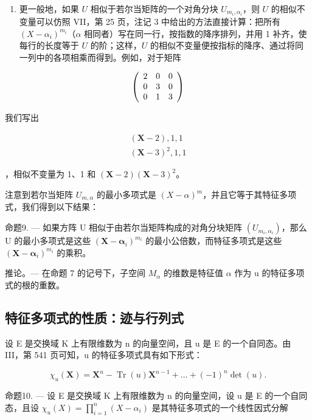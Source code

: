 \begin{enumerate}
\def\labelenumi{\arabic{enumi})}
\setcounter{enumi}{1}
\tightlist
\item
  更一般地，如果 \(U\) 相似于若尔当矩阵的一个对角分块 \(U_{m_i,\alpha_i}\)，则 \(U\) 的相似不变量可以仿照 VII，第 25 页，注记 3 中给出的方法直接计算：把所有 \((X - \alpha_i)^{m_i}\)（\(\alpha\) 相同者）写在同一行，按指数的降序排列，并用 1 补齐，使每行的长度等于 \(U\) 的阶；这样，\(U\) 的相似不变量便按指标的降序、通过将同一列中的各项相乘而得到。例如，对于矩阵
\end{enumerate}

\[
\left( \begin{array}{c c c} 2 & 0 & 0 \\ 0 & 3 & 0 \\ 0 & 1 & 3 \end{array} \right)
\]

我们写出

\[
\begin{array}{l} (\mathbf {X} - 2), 1, 1 \\ (\mathbf {X} - 3) ^ {2}, 1, 1 \end{array}
\]

，相似不变量为 1、1 和 \((\mathbf{X} - 2)(\mathbf{X} - 3)^2\)。

注意到若尔当矩阵 \(U_{m,\alpha}\) 的最小多项式是 \((X-\alpha)^{m}\)，并且它等于其特征多项式，我们得到以下结果：

命题9. --- 如果方阵 U 相似于由若尔当矩阵构成的对角分块矩阵 \((U_{m_{i},\alpha_{i}})\)，那么 U 的最小多项式是这些 \((\mathbf{X}-\boldsymbol{\alpha}_{i})^{m_{i}}\) 的最小公倍数，而特征多项式是这些 \((\mathbf{X}-\boldsymbol{\alpha}_{i})^{m_{i}}\) 的乘积。

推论。--- 在命题 7 的记号下，子空间 \(M_{\alpha}\) 的维数是特征值 \(\alpha\) 作为 u 的特征多项式的根的重数。

\subsection{特征多项式的性质：迹与行列式}

设 E 是交换域 K 上有限维数为 n 的向量空间，且 u 是 E 的一个自同态。由 III，第 541 页可知，u 的特征多项式具有如下形式：

\[
\chi_ {u} (\mathbf {X}) = \mathbf {X} ^ {n} - \operatorname{Tr} (u) \mathbf {X} ^ {n - 1} + \dots + (- 1) ^ {n} \det (u).\tag{5}
\]

命题10. --- 设 E 是交换域 K 上有限维数为 n 的向量空间，设 u 是 E 的一个自同态，且设 \(\chi_u(X) = \prod_{i=1}^{n}(X - \alpha_i)\) 是其特征多项式的一个线性因式分解

